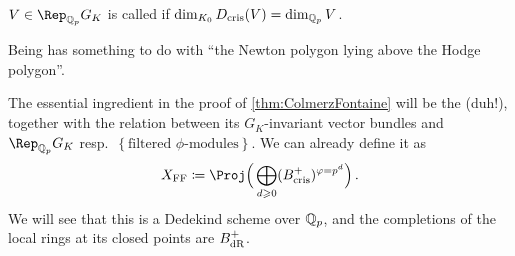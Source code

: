\documentclass[a4paper, 10pt, oneside, DIV=9, chapterprefix=true, numbers=enddot]{scrbook}
\begin{document}
\begin{rem}
	\begin{numerate}
		\item $V\in \Rep_{\IQ_p}G_K$ is called  if $\dim_{K_0}D_{\mathrm{cris}}(V)=\dim_{\mathbb{Q}_p}V$.
		\item Being  has something to do with \enquote{the Newton polygon lying above the Hodge polygon}.
		\item The essential ingredient in the proof of \cref{thm:ColmerzFontaine} will be the  (duh!), together with the relation between its $G_K$-invariant vector bundles and $\Rep_{\IQ_p}G_K$ resp.\ $\left\{\text{filtered }\phi\text{-modules}\right\}$. We can already define it as
		\begin{equation*}
			X_\FFC\coloneqq \Proj\Big(\bigoplus_{d\geq 0}(B_\cris^+)^{\phi=p^d}\Big)\,.
		\end{equation*}
		We will see that this is a Dedekind scheme over $\mathbb{Q}_p$, and the completions of the local rings at its closed points are $B_{\mathrm{dR}}^+$.
	\end{numerate}
\end{rem}

\mainmatter{}
\renewcommand{\thedummy}{\thesection.\arabic{dummy}}


\appendix
\backmatter{}
\printbibliography
\end{document}
